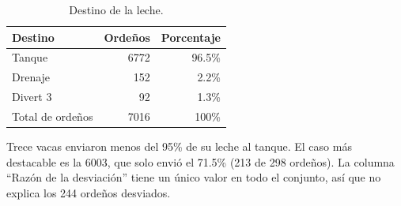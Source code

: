 \begin{table}[H]
  \centering
  \caption{Destino de la leche.}
  \label{tab:destino}
  \begin{tabular}{lrr}
    \toprule
    Destino & Ordeños & Porcentaje \\
    \midrule
    Tanque & 6772 & 96.5\% \\
    Drenaje & 152 & 2.2\% \\
    Divert 3 & 92 & 1.3\% \\
    Total de ordeños & 7016 & 100\% \\
    \bottomrule
  \end{tabular}
\end{table}

Trece vacas enviaron menos del 95\% de su leche al tanque. El caso más destacable es la 6003, que solo envió el 71.5\% (213 de 298 ordeños). La columna ``Razón de la desviación'' tiene un único valor en todo el conjunto, así que no explica los 244 ordeños desviados.
